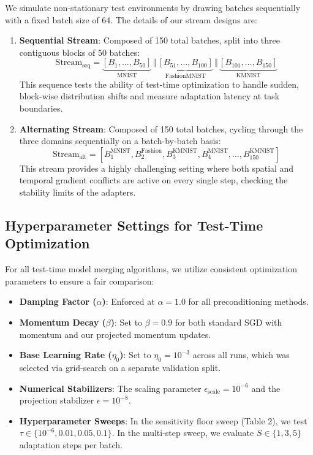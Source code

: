 \documentclass{article}
\theoremstyle{plain}
\theoremstyle{definition}
\theoremstyle{remark}
\begin{document}
We simulate non-stationary test environments by drawing batches sequentially with a fixed batch size of 64. The details of our stream designs are:
\begin{enumerate}
    \item \textbf{Sequential Stream}: Composed of 150 total batches, split into three contiguous blocks of 50 batches:
    \begin{equation}
        \text{Stream}_{\text{seq}} = \underbrace{[B_1, \dots, B_{50}]}_{\text{MNIST}} \, \Vert \, \underbrace{[B_{51}, \dots, B_{100}]}_{\text{FashionMNIST}} \, \Vert \, \underbrace{[B_{101}, \dots, B_{150}]}_{\text{KMNIST}}
    \end{equation}
    This sequence tests the ability of test-time optimization to handle sudden, block-wise distribution shifts and measure adaptation latency at task boundaries.
    \item \textbf{Alternating Stream}: Composed of 150 total batches, cycling through the three domains sequentially on a batch-by-batch basis:
    \begin{equation}
        \text{Stream}_{\text{alt}} = [B_1^{\text{MNIST}}, B_2^{\text{Fashion}}, B_3^{\text{KMNIST}}, B_4^{\text{MNIST}}, \dots, B_{150}^{\text{KMNIST}}]
    \end{equation}
    This stream provides a highly challenging setting where both spatial and temporal gradient conflicts are active on every single step, checking the stability limits of the adapters.
\end{enumerate}

\subsection{Hyperparameter Settings for Test-Time Optimization}
\label{app:hyperparams}
For all test-time model merging algorithms, we utilize consistent optimization parameters to ensure a fair comparison:
\begin{itemize}
    \item \textbf{Damping Factor ($\alpha$)}: Enforced at $\alpha = 1.0$ for all preconditioning methods.
    \item \textbf{Momentum Decay ($\beta$)}: Set to $\beta = 0.9$ for both standard SGD with momentum and our projected momentum updates.
    \item \textbf{Base Learning Rate ($\eta_0$)}: Set to $\eta_0 = 10^{-3}$ across all runs, which was selected via grid-search on a separate validation split.
    \item \textbf{Numerical Stabilizers}: The scaling parameter $\epsilon_{\text{scale}} = 10^{-6}$ and the projection stabilizer $\epsilon = 10^{-8}$.
    \item \textbf{Hyperparameter Sweeps}: In the sensitivity floor sweep (Table 2), we test $\tau \in \{10^{-6}, 0.01, 0.05, 0.1\}$. In the multi-step sweep, we evaluate $S \in \{1, 3, 5\}$ adaptation steps per batch.
\end{itemize}
\end{document}
